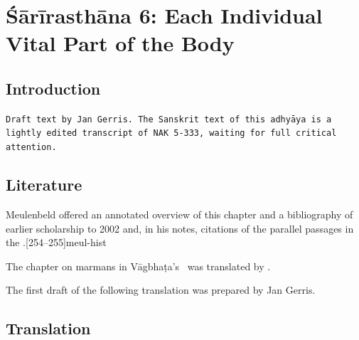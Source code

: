 
\chapter{Śārīrasthāna 6:  Each Individual Vital Part of the Body}


\section{Introduction}
\texttt{Draft text by Jan Gerris.
    The Sanskrit text of this adhyāya is a lightly 
    edited transcript of NAK 5-333,
    waiting for full critical attention.}

\section{Literature} 

Meulenbeld offered an annotated overview of this chapter and a
bibliography of earlier scholarship to 2002 and, in his notes, citations
of the parallel passages in the \CS.[254--255]{meul-hist}   

The chapter on marmans in Vāgbhaṭa's \AH\ was translated by \citet{wuja-2003}.

The first draft of the following translation was prepared by Jan
Gerris.

\newpage

\section{Translation}

